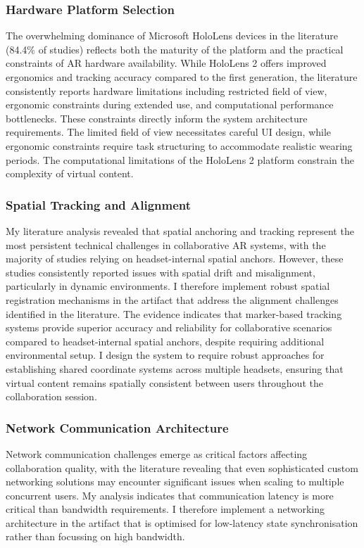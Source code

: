 \subsubsection{Hardware Platform Selection}

The overwhelming dominance of Microsoft HoloLens devices in the literature (84.4\% of studies) reflects both the maturity of the platform and the practical constraints of AR hardware availability. While HoloLens 2 offers improved ergonomics and tracking accuracy compared to the first generation, the literature consistently reports hardware limitations including restricted field of view, ergonomic constraints during extended use, and computational performance bottlenecks. These constraints directly inform the system architecture requirements. The limited field of view necessitates careful UI design, while ergonomic constraints require task structuring to accommodate realistic wearing periods. The computational limitations of the HoloLens 2 platform constrain the complexity of virtual content.

\subsubsection{Spatial Tracking and Alignment}

My literature analysis revealed that spatial anchoring and tracking represent the most persistent technical challenges in collaborative AR systems, with the majority of studies relying on headset-internal spatial anchors. However, these studies consistently reported issues with spatial drift and misalignment, particularly in dynamic environments.
I therefore implement robust spatial registration mechanisms in the artifact that address the alignment challenges identified in the literature. The evidence indicates that marker-based tracking systems provide superior accuracy and reliability for collaborative scenarios compared to headset-internal spatial anchors, despite requiring additional environmental setup. I design the system to require robust approaches for establishing shared coordinate systems across multiple headsets, ensuring that virtual content remains spatially consistent between users throughout the collaboration session.

\subsubsection{Network Communication Architecture}

Network communication challenges emerge as critical factors affecting collaboration quality, with the literature revealing that even sophisticated custom networking solutions may encounter significant issues when scaling to multiple concurrent users. My analysis indicates that communication latency is more critical than bandwidth requirements. I therefore implement a networking architecture in the artifact that is optimised for low-latency state synchronisation rather than focussing on high bandwidth.


